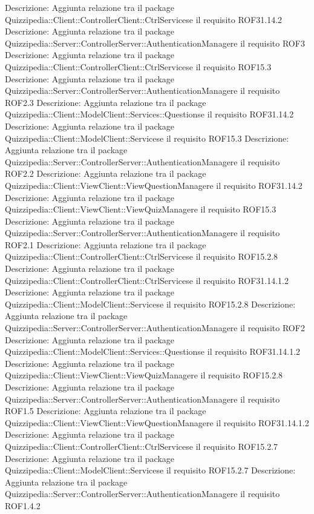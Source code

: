 Descrizione: Aggiunta relazione tra il package Quizzipedia::Client::ControllerClient::CtrlServicese il requisito ROF31.14.2 
Descrizione: Aggiunta relazione tra il package Quizzipedia::Server::ControllerServer::AuthenticationManagere il requisito ROF3 
Descrizione: Aggiunta relazione tra il package Quizzipedia::Client::ControllerClient::CtrlServicese il requisito ROF15.3 
Descrizione: Aggiunta relazione tra il package Quizzipedia::Server::ControllerServer::AuthenticationManagere il requisito ROF2.3 
Descrizione: Aggiunta relazione tra il package Quizzipedia::Client::ModelClient::Services::Questionse il requisito ROF31.14.2 
Descrizione: Aggiunta relazione tra il package Quizzipedia::Client::ModelClient::Servicese il requisito ROF15.3 
Descrizione: Aggiunta relazione tra il package Quizzipedia::Server::ControllerServer::AuthenticationManagere il requisito ROF2.2 
Descrizione: Aggiunta relazione tra il package Quizzipedia::Client::ViewClient::ViewQuestionManagere il requisito ROF31.14.2 
Descrizione: Aggiunta relazione tra il package Quizzipedia::Client::ViewClient::ViewQuizManagere il requisito ROF15.3 
Descrizione: Aggiunta relazione tra il package Quizzipedia::Server::ControllerServer::AuthenticationManagere il requisito ROF2.1 
Descrizione: Aggiunta relazione tra il package Quizzipedia::Client::ControllerClient::CtrlServicese il requisito ROF15.2.8 
Descrizione: Aggiunta relazione tra il package Quizzipedia::Client::ControllerClient::CtrlServicese il requisito ROF31.14.1.2 
Descrizione: Aggiunta relazione tra il package Quizzipedia::Client::ModelClient::Servicese il requisito ROF15.2.8 
Descrizione: Aggiunta relazione tra il package Quizzipedia::Server::ControllerServer::AuthenticationManagere il requisito ROF2 
Descrizione: Aggiunta relazione tra il package Quizzipedia::Client::ModelClient::Services::Questionse il requisito ROF31.14.1.2 
Descrizione: Aggiunta relazione tra il package Quizzipedia::Client::ViewClient::ViewQuizManagere il requisito ROF15.2.8 
Descrizione: Aggiunta relazione tra il package Quizzipedia::Server::ControllerServer::AuthenticationManagere il requisito ROF1.5 
Descrizione: Aggiunta relazione tra il package Quizzipedia::Client::ViewClient::ViewQuestionManagere il requisito ROF31.14.1.2 
Descrizione: Aggiunta relazione tra il package Quizzipedia::Client::ControllerClient::CtrlServicese il requisito ROF15.2.7 
Descrizione: Aggiunta relazione tra il package Quizzipedia::Client::ModelClient::Servicese il requisito ROF15.2.7 
Descrizione: Aggiunta relazione tra il package Quizzipedia::Server::ControllerServer::AuthenticationManagere il requisito ROF1.4.2 
